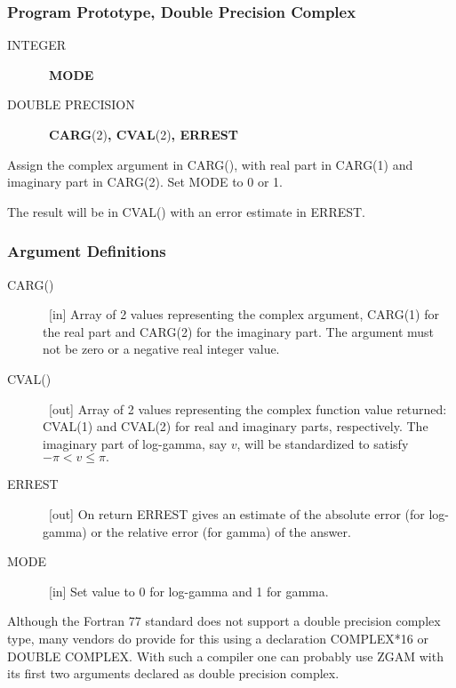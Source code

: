 \documentclass[twoside]{MATH77}
\begin{document}
\subsubsection{Program Prototype, Double Precision Complex}

\begin{description}
\item[INTEGER]  \ {\bf MODE}

\item[DOUBLE PRECISION]  \ {\bf CARG}(2){\bf , CVAL}(2){\bf , ERREST}
\end{description}

Assign the complex argument in CARG(), with real part in CARG(1) and
imaginary part in CARG(2). Set MODE to 0 or 1.

\begin{center}
\end{center}

The result will be in CVAL() with an error estimate in ERREST.

\subsubsection{Argument Definitions}

\begin{description}
\item[CARG()]  \ [in] Array of 2 values representing the complex argument,
CARG(1) for the real part and CARG(2) for the imaginary part. The argument
must not be zero or a negative real integer value.

\item[CVAL()]  \ [out] Array of 2 values representing the complex function
value returned: CVAL(1) and CVAL(2) for real and imaginary parts,
respectively. The imaginary part of log-gamma, say $v$, will be standardized
to satisfy $-\pi <v\leq \pi .$

\item[ERREST]  \ [out] On return ERREST gives an estimate of the absolute
error (for log-gamma) or the relative error (for gamma) of the answer.

\item[MODE]  \ [in] Set value to 0 for log-gamma and 1 for gamma.
\end{description}

Although the Fortran 77 standard does not support a double precision complex
type, many vendors do provide for this using a declaration COMPLEX*16 or
DOUBLE COMPLEX. With such a compiler one can probably use ZGAM with its
first two arguments declared as double precision complex.
\end{document}
